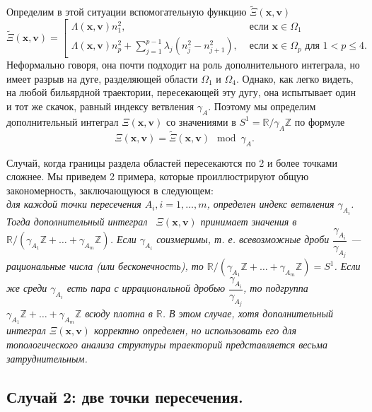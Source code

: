 Определим в этой ситуации вспомогательную функцию $\widetilde{\Xi}(\mathbf{x}, \mathbf{v})$ 
\begin{equation*}
\widetilde{\Xi}(\mathbf{x}, \mathbf{v}) = \left[
\begin{array}{ll}
    \Lambda(\mathbf{x}, \mathbf{v}) n_1^2, &  \text{ если } \mathbf{x} \in \Omega_1 
    \\
    \Lambda(\mathbf{x}, \mathbf{v}) n_p^2 + 
    \sum_{j=1}^{p-1} \lambda_j(n_j^2-n_{j+1}^2), & \text{ если } \mathbf{x} \in \Omega_p \text{ для } 1 < p \leq 4. 
\end{array}
\right.
\end{equation*}
Неформально говоря, она почти подходит на роль дополнительного интеграла, но имеет разрыв на дуге, разделяющей области $\Omega_1$ и $\Omega_4$. Однако, как легко видеть, на любой бильярдной траектории, пересекающей эту дугу, она испытывает один и тот же скачок, равный индексу ветвления $\gamma_A$. 
Поэтому мы определим дополнительный интеграл $\Xi(\mathbf{x}, \mathbf{v})$ со значениями в $S^1= \mathbb{R}/\gamma_A \mathbb{Z}$ по формуле $$\Xi(\mathbf{x}, \mathbf{v}) = \widetilde{\Xi}(\mathbf{x}, \mathbf{v}) \mod \gamma_A.$$

Случай, когда границы раздела областей пересекаются по 2 и более точками сложнее. Мы приведем 2 примера, которые проиллюстрируют общую закономерность, заключающуюся в следующем: \\
\textit{ 
для каждой точки пересечения $A_i, i=1,\ldots,m$, определен индекс ветвления $\gamma_{A_i}$. Тогда дополнительный интеграл \  $\Xi(\mathbf{x}, \mathbf{v})$ принимает значения в $\mathbb{R}/(\gamma_{A_1} \mathbb{Z}+ \ldots + \gamma_{A_m} \mathbb{Z})$. Если $\gamma_{A_i}$ соизмеримы, т. е. всевозможные дроби $\dfrac{\gamma_{A_i}}{\gamma_{A_j}}$ --- рациональные числа (или бесконечность), то $\mathbb{R}/(\gamma_{A_1} \mathbb{Z}+ \ldots + \gamma_{A_m} \mathbb{Z}) = S^1$. Если же среди $\gamma_{A_i}$ есть пара с иррациональной дробью $\dfrac{\gamma_{A_i}}{\gamma_{A_j}}$, то подгруппа $\gamma_{A_1} \mathbb{Z}+ \ldots + \gamma_{A_m} \mathbb{Z}$ всюду плотна в $\mathbb{R}$. В этом случае, хотя дополнительный интеграл $\Xi(\mathbf{x}, \mathbf{v})$ корректно определен, но использовать его для топологического анализа структуры траекторий представляется весьма затруднительным.}

\bigskip
\subsection{ Случай 2: две точки пересечения.}

